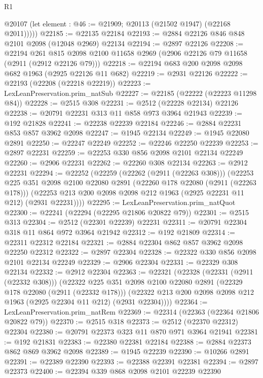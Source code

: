 \begin{lexlean}{R1}
\begin{coremodule}
          @20107
          (let element : @46 := @21909; @20113 (@21502 @1947) (@22168 @2011)))))
@22185 := @22135 @22184
@22193 := @2884 @22126 @846 @848 @2101 @2098 (@12048 @2969) @22134
@22194 := @2897 @22126
@22208 := @22194
    @261
    @815
    @2098
    @2100
    @11658
    @2969
    (@2906 @22126 @79 @11658 (@2911 (@2912 @22126 @79)))
@22218 := @22194 @683 @200 @2098 @2098 @682 @1963 (@2925 @22126 @11 @682)
@22219 := @2931 @22126
@22222 := @22193 (@22208 (@22218 @22219))
@22223 := LexLeanPreservation.prim_natSub
@22227 := @22185 (@22222 (@22223 @11298 @84))
@22228 := @2515 @308
@22231 := @2512 (@22228 @22134) @22126
@22238 := @20791 @22231 @313 @11 @858 @973 @3964 @21943
@22239 := @192 @21828
@22241 := @22238 @22239 @22184
@22246 := @2884 @22231 @853 @857 @3962 @2098
@22247 := @1945 @22134
@22249 := @1945 @22080 @2891
@22250 := @22247 @22249
@22252 := @22246 @22250 @22239
@22253 := @2897 @22231
@22259 := @22253 @330 @856 @2098 @2101 @22134 @22249
@22260 := @2906 @22231
@22262 := @22260 @308 @22134
@22263 := @2912 @22231
@22294 := @22252
    (@22259
      (@22262 (@2911 (@22263 @308)))
      (@22253
        @225
        @351
        @2098
        @2100
        @22080
        @2891
        (@22260 @178 @22080 (@2911 (@22263 @178)))
        (@22253 @213 @200 @2098 @2098 @212 @1963 (@2925 @22231 @11 @212) (@2931 @22231))))
@22295 := LexLeanPreservation.prim_natQuot
@22300 := @22241 (@22294 (@22295 @21806 @20822 @79))
@22301 := @2515 @313
@22304 := @2512 (@22301 @22239) @22231
@22311 := @20791 @22304 @318 @11 @864 @972 @3964 @21942
@22312 := @192 @21809
@22314 := @22311 @22312 @22184
@22321 := @2884 @22304 @862 @857 @3962 @2098 @22250 @22312
@22322 := @2897 @22304
@22328 := @22322 @330 @856 @2098 @2101 @22134 @22249
@22329 := @2906 @22304
@22331 := @22329 @308 @22134
@22332 := @2912 @22304
@22363 := @22321
    (@22328
      (@22331 (@2911 (@22332 @308)))
      (@22322
        @225
        @351
        @2098
        @2100
        @22080
        @2891
        (@22329 @178 @22080 (@2911 (@22332 @178)))
        (@22322 @213 @200 @2098 @2098 @212 @1963 (@2925 @22304 @11 @212) (@2931 @22304))))
@22364 := LexLeanPreservation.prim_natRem
@22369 := @22314 (@22363 (@22364 @21806 @20822 @79))
@22370 := @2515 @318
@22373 := @2512 (@22370 @22312) @22304
@22380 := @20791 @22373 @323 @11 @870 @971 @3964 @21941
@22381 := @192 @21831
@22383 := @22380 @22381 @22184
@22388 := @2884 @22373 @862 @869 @3962 @2098
@22389 := @1945 @22239
@22390 := @10266 @2891
@22391 := @22389 @22390
@22393 := @22388 @22391 @22381
@22394 := @2897 @22373
@22400 := @22394 @339 @868 @2098 @2101 @22239 @22390

\end{coremodule}
\end{lexlean}
